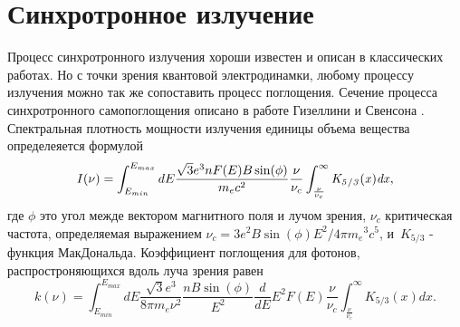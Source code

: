\section{Синхротронное излучение}
Процесс синхротронного излучения хороши известен и описан в классических работах. Но с точки зрения квантовой электродинамки, любому процессу излучения можно так же сопоставить процесс поглощения. Сечение процесса синхротронного самопоглощения описано в работе Гизеллини и Свенсона \cite{Ghisellini1991}. Спектральная плотность мощности излучения единицы объема вещества определеяется формулой
\begin{equation} \label{emission}
	I(\nu)=\int_{E_{min}}^{E_{max}} dE \frac {\sqrt {3}{e}^{3}n F(E) B \sin ( \phi)}{{m_e}{c}^{2}}
	\frac{\nu}{\nu_c}\int_{\frac {\nu}{\nu_c}}^{\infty }\it K_{5/3}(x)dx,
\end{equation}
где $\phi$ это угол межде вектором магнитного поля и лучом зрения, $\displaystyle\nu_{c}$ критическая частота, определяемая выражением $\displaystyle\nu_{c} = 3 e^{2} B \sin(\phi) E^{2}/4\pi {m_{e}}^{3} c^{5}$, и~$K_{5/3}$ - функция МакДональда.
Коэффициент поглощения для фотонов, распростроняющихся вдоль луча зрения равен
\begin{equation}\label{absorption}
	k(\nu)=\int_{E_{min}}^{E_{max}}dE\frac {\sqrt {3}{e}^{3}}{8\pi m_e \nu^2}\frac{n B\sin(\phi)}{E^2}
	\frac{d}{dE} E^2 F(E)\frac {\nu}{ \nu_c}\int_{\frac {\nu}{ \nu_c}}^{\infty }K_{5/3}(x) dx.
\end{equation}